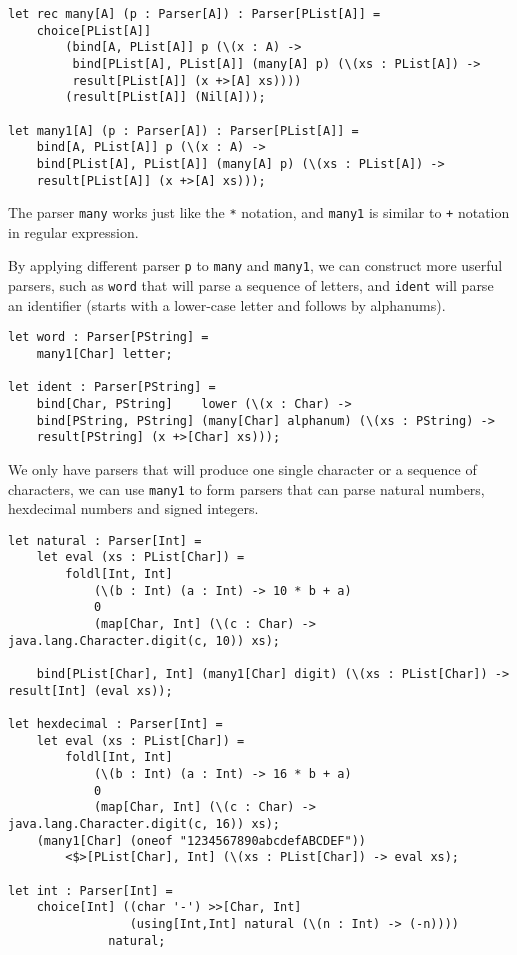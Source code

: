 \begin{lstlisting}
let rec many[A] (p : Parser[A]) : Parser[PList[A]] =
    choice[PList[A]]
        (bind[A, PList[A]] p (\(x : A) ->
         bind[PList[A], PList[A]] (many[A] p) (\(xs : PList[A]) ->
         result[PList[A]] (x +>[A] xs))))
        (result[PList[A]] (Nil[A]));

let many1[A] (p : Parser[A]) : Parser[PList[A]] =
    bind[A, PList[A]] p (\(x : A) ->
    bind[PList[A], PList[A]] (many[A] p) (\(xs : PList[A]) ->
    result[PList[A]] (x +>[A] xs)));
\end{lstlisting}

The parser \texttt{many} works just like the \texttt{*} notation, and \texttt{many1} is similar to \texttt{+} notation in regular expression.

By applying different parser \texttt{p} to \texttt{many} and \texttt{many1}, we can construct more userful parsers, such as \texttt{word} that will parse a sequence of letters, and \texttt{ident} will parse an identifier (starts with a lower-case letter and follows by alphanums).

\begin{lstlisting}
let word : Parser[PString] =
    many1[Char] letter;

let ident : Parser[PString] =
    bind[Char, PString]    lower (\(x : Char) ->
    bind[PString, PString] (many[Char] alphanum) (\(xs : PString) ->
    result[PString] (x +>[Char] xs)));
\end{lstlisting}

We only have parsers that will produce one single character or a sequence of characters, we can use \texttt{many1} to form parsers that can parse natural numbers, hexdecimal numbers and signed integers.

\begin{lstlisting}
let natural : Parser[Int] =
    let eval (xs : PList[Char]) =
        foldl[Int, Int]
            (\(b : Int) (a : Int) -> 10 * b + a)
            0
            (map[Char, Int] (\(c : Char) -> java.lang.Character.digit(c, 10)) xs);

    bind[PList[Char], Int] (many1[Char] digit) (\(xs : PList[Char]) -> result[Int] (eval xs));

let hexdecimal : Parser[Int] =
    let eval (xs : PList[Char]) =
        foldl[Int, Int]
            (\(b : Int) (a : Int) -> 16 * b + a)
            0
            (map[Char, Int] (\(c : Char) -> java.lang.Character.digit(c, 16)) xs);
    (many1[Char] (oneof "1234567890abcdefABCDEF"))
        <$>[PList[Char], Int] (\(xs : PList[Char]) -> eval xs);

let int : Parser[Int] =
    choice[Int] ((char '-') >>[Char, Int]
                 (using[Int,Int] natural (\(n : Int) -> (-n))))
              natural;
\end{lstlisting}

